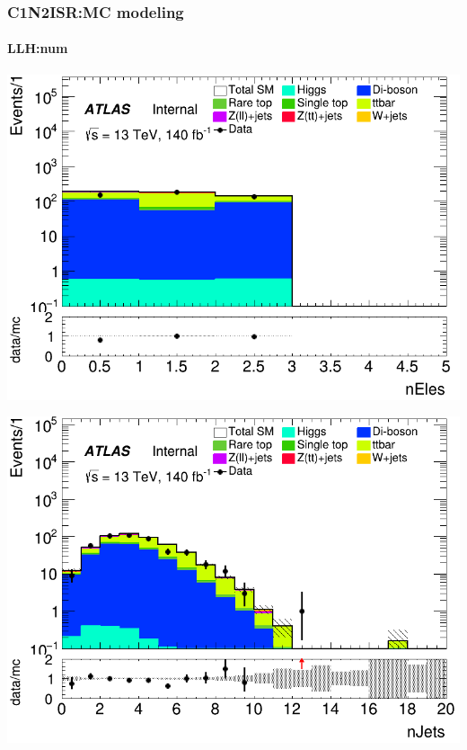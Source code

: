 \documentclass[usenames,dvipsnames]{beamer}
\begin{document}
\begin{frame}
\frametitle{C1N2ISR:MC modeling}
\framesubtitle{LLH:\quad num}
    \begin{minipage}{0.32\textwidth}
        \centering
        \includegraphics[width=\textwidth]{graphics/LLH_met/LLH_met_nEles.png}
    \end{minipage}
    \hfill
    \begin{minipage}{0.32\textwidth}
        \centering
        \includegraphics[width=\textwidth]{graphics/LLH_met/LLH_met_nJets.png}
    \end{minipage}
    \hfill
    \begin{minipage}{0.32\textwidth}
        \centering

\end{minipage}
\end{frame}
\end{document}
